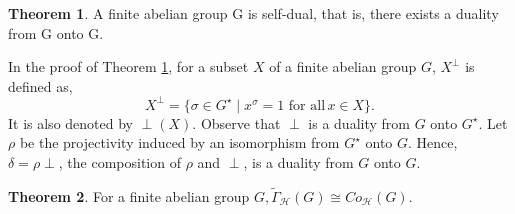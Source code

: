 \documentclass[11pt,a4paper]{article}
\theoremstyle{definition}
\newtheorem{theorem}{Theorem}[section]
\theoremstyle{remark}
\begin{document}
	\begin{theorem}\label{selfduality}\cite{schmidt} 
		A finite abelian group G is self-dual, that is, there exists 
		a duality from G onto G.
	\end{theorem}
		\noindent In the proof of Theorem \ref{selfduality}, for a subset $X$ of a finite abelian group $G$, $X^\perp$ is defined as,  $$X^{\perp}=\{\sigma \in G^\star \mid x^{\sigma}=1\,\,  \text{for all}\, x \in X\}.$$ It is also denoted by $\perp(X)$. Observe that $\perp$ is a duality from $G$ onto $G^\star$. Let $\rho$ be the projectivity induced by an isomorphism from $G^\star$ onto $G$. Hence, $\delta=\rho\perp$, the composition of $\rho$ and $\perp$, is a duality from $G$ onto $G$.
	\begin{theorem}\label{iso}
		For a finite abelian group $G, \tilde{\Gamma}_{\mathcal{H}}(G) \cong Co_\mathcal{H}(G)$. 
	\end{theorem}
\end{document}
